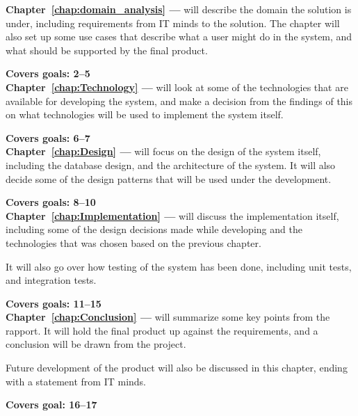 \textbf{Chapter~\ref{chap:domain_analysis} --- }
will describe the domain the solution is under, including requirements from IT
minds to the solution. The chapter will also set up some use cases that
describe what a user might do in the system, and what should be supported by the
final product. 

\textbf{Covers goals: 2--5}\\

\textbf{Chapter~\ref{chap:Technology} --- } will look at
some of the technologies that are available for developing the system, and make
a decision from the findings of this on what technologies will be used to
implement the system itself. 

\textbf{Covers goals: 6--7}\\

\textbf{Chapter~\ref{chap:Design} --- } will focus on the
design of the system itself, including the database design, and the architecture
of the system. It will also decide some of the design patterns that will be used
under the development. 

\textbf{Covers goals: 8--10}\\

\textbf{Chapter~\ref{chap:Implementation} --- } will
discuss the implementation itself, including some of the design decisions made
while developing and the technologies that was chosen based on the previous
chapter. 

It will also go over how testing of the system has been done, including unit
tests, and integration tests. 

\textbf{Covers goals: 11--15}\\


\textbf{Chapter~\ref{chap:Conclusion} --- } will
summarize some key points from the rapport. It will hold the final product up
against the requirements, and a conclusion will be drawn from the project.

Future development of the product will also be discussed in this chapter, ending
with a statement from IT minds. 

\textbf{Covers goal: 16--17}
